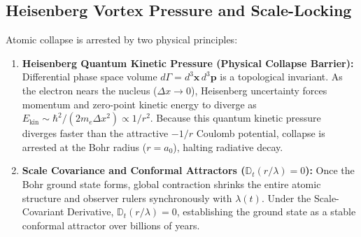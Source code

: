 \subsection{Heisenberg Vortex Pressure and Scale-Locking}
Atomic collapse is arrested by two physical principles:
\begin{enumerate}
    \item \textbf{Heisenberg Quantum Kinetic Pressure (Physical Collapse Barrier):} Differential phase space volume $d\Gamma = d^3\mathbf{x} \, d^3\mathbf{p}$ is a topological invariant. As the electron nears the nucleus ($\Delta x \to 0$), Heisenberg uncertainty forces momentum and zero-point kinetic energy to diverge as $E_{\mathrm{kin}} \sim \hbar^2 / (2m_e \Delta x^2) \propto 1/r^2$. Because this quantum kinetic pressure diverges faster than the attractive $-1/r$ Coulomb potential, collapse is arrested at the Bohr radius ($r = a_0$), halting radiative decay.
    \item \textbf{Scale Covariance and Conformal Attractors ($\mathbb{D}_t(r/\lambda) = 0$):} Once the Bohr ground state forms, global contraction shrinks the entire atomic structure and observer rulers synchronously with $\lambda(t)$. Under the Scale-Covariant Derivative, $\mathbb{D}_t(r/\lambda) = 0$, establishing the ground state as a stable conformal attractor over billions of years.
\end{enumerate}

